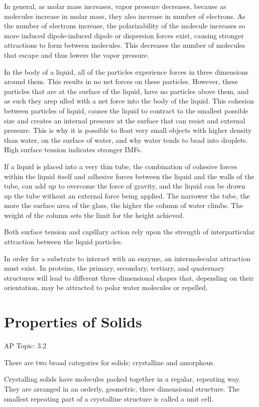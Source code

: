 \documentclass[../chem.tex]{subfiles}
\begin{document}
In general, as molar mass increases, vapor pressure decreases, because as molecules increase in molar mass, they also increase in number of electrons. As the number 
of electrons increase, the polarizability of the molecule increases so more induced dipole-induced dipole or dispersion forces exist, causing 
stronger attractions to form between molecules. This decreases the number of molecules that escape and thus lowers the vapor pressure.

In the body of a liquid, all of the particles experience forces in three dimensions around them. This results in no net forces on these particles. 
However, these particles that are at the surface of the liquid, have no particles above them, and as such they arep ulled with a net force into the body 
of the liquid. This cohesion between particles of liquid, causes the liquid to contract to the smallest possible size and creates an internal pressure 
at the surface that can resist and external pressure. This is why it is possible to float very small objects with higher density than water, on the 
surface of water, and why water tends to bead into droplets. High surface tension indicates stronger IMFs.

If a liquid is placed into a very thin tube, the combination of cohesive forces within the liquid itself and adhesive forces between the liquid 
and the walls of the tube, can add up to overcome the force of gravity, and the liquid can be drawn up the tube without an external force 
being applied. The narrower the tube, the more the surface area of the glass, the higher the column of water climbs. The weight of the column sets the 
limit for the height achieved.

Both surface tension and capillary action rely upon the strength of interparticular attraction between the liquid particles.

In order for a substrate to interact with an enzyme, an intermolecular attraction must exist. In proteins, the primary, secondary, 
tertiary, and quaternary structures will lead to different three dimensional shapes that, depending on their orientation, may be attracted to polar 
water molecules or repelled.
\section{Properties of Solids}
AP Topic: 3.2

There are two broad categories for solids: crystalline and amorphous.

Crystalling solids have molecules packed together in a regular, repeating way. They are arranged in an orderly, geometric, three dimensional structure. 
The smallest repeating part of a crystalline structure is called a unit cell.
\end{document}
